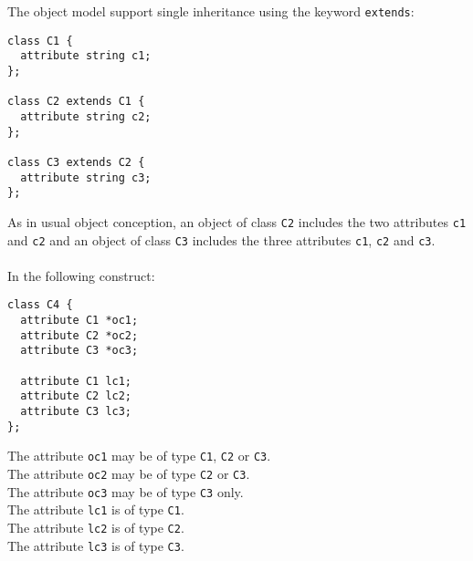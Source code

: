 The object model support single inheritance using the keyword \texttt{extends}:
\vspace{-0.2cm}
\begin{verbatim}
class C1 {
  attribute string c1;
};

class C2 extends C1 {
  attribute string c2;
};

class C3 extends C2 {
  attribute string c3;
};
\end{verbatim}
As in usual object conception, an object of class \texttt{C2} includes the two
attributes \texttt{c1} and \texttt{c2} and an object of class \texttt{C3}
includes the three attributes \texttt{c1}, \texttt{c2} and \texttt{c3}.
\\
\\
In the following construct:
\begin{verbatim}
class C4 {
  attribute C1 *oc1;
  attribute C2 *oc2;
  attribute C3 *oc3;

  attribute C1 lc1;
  attribute C2 lc2;
  attribute C3 lc3;
};
\end{verbatim}
The attribute \texttt{oc1} may be of type \texttt{C1}, \texttt{C2} or
\texttt{C3}.\\
The attribute \texttt{oc2} may be of type \texttt{C2} or \texttt{C3}.\\
The attribute \texttt{oc3} may be of type \texttt{C3} only.\\
The attribute \texttt{lc1} is of type \texttt{C1}.\\
The attribute \texttt{lc2} is of type \texttt{C2}.\\
The attribute \texttt{lc3} is of type \texttt{C3}.


